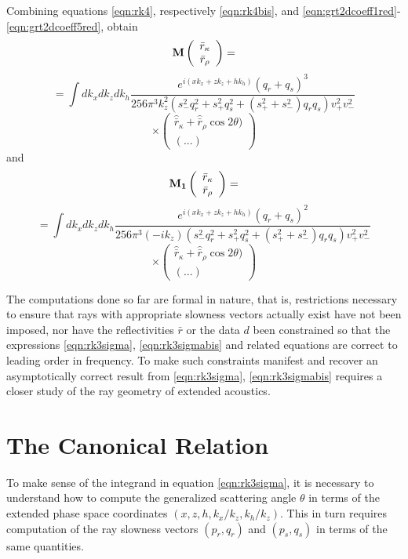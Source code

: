 Combining equations \ref{eqn:rk4}, respectively \ref{eqn:rk4bis}, and \ref{eqn:grt2dcoeff1red}-\ref{eqn:grt2dcoeff5red}, obtain
\[
{\bf M} 
\left(\begin{array}{c}
\bar{r}_{\kappa} \\
\bar{r}_{\rho}
\end{array}
\right) = 
\]
\[
= \int dk_x dk_z dk_h \frac{e^{i(xk_{x}+zk_{z}+hk_{h})}(q_r+q_s)^3}{256\pi^3 
  k^2_z(s_-^2q_r^2 + s_+^2q_s^2 +
(s_+^2+s_-^2)q_rq_s)v^2_+v^2_-} 
\]
\begin{equation}
\label{eqn:rk3sigma}
\times 
\left(
\begin{array}{c}
\hat{\bar{r}}_{\kappa} + \hat{\bar{r}}_{\rho} \cos 2 \theta) \\ 
(...) 
\end{array}
\right)
\end{equation}
and
\[
{\bf M_1} 
\left(\begin{array}{c}
\bar{r}_{\kappa} \\
\bar{r}_{\rho}
\end{array}
\right) = 
\]
\[
= \int dk_x dk_z dk_h \frac{e^{i(xk_{x}+zk_{z}+hk_{h})}(q_r+q_s)^2}{256\pi^3 
  (-ik_z)(s_-^2q_r^2 + s_+^2q_s^2 +
(s_+^2+s_-^2)q_rq_s)v^2_+v^2_-} 
\]
\begin{equation}
\label{eqn:rk3sigmabis}
\times 
\left(
\begin{array}{c}
\hat{\bar{r}}_{\kappa} + \hat{\bar{r}}_{\rho} \cos 2 \theta) \\ 
(...) 
\end{array}
\right)
\end{equation}

The computations done so far are formal in nature, that is,
restrictions necessary to ensure that rays with appropriate slowness
vectors actually exist have not been imposed, nor have the
reflectivities $\bar{r}$ or the data $d$ been constrained so that the
expressions \ref{eqn:rk3sigma},  \ref{eqn:rk3sigmabis} and related equations are correct to
leading order in frequency. To make such constraints manifest and
recover an asymptotically correct result from \ref{eqn:rk3sigma}, \ref{eqn:rk3sigmabis}
requires a closer study of the ray geometry of extended acoustics.

\section{The Canonical Relation}
To make sense of the integrand in equation \ref{eqn:rk3sigma}, it is
necessary to
understand how to compute the generalized scattering angle $\theta$ in
terms of the extended phase space coordinates $(x,z,h,k_x/k_z,
k_h/k_z)$. This in turn requires computation of the ray slowness
vectors $(p_r,q_r)$ and $(p_s,q_s)$ in terms of the same
quantities. 

